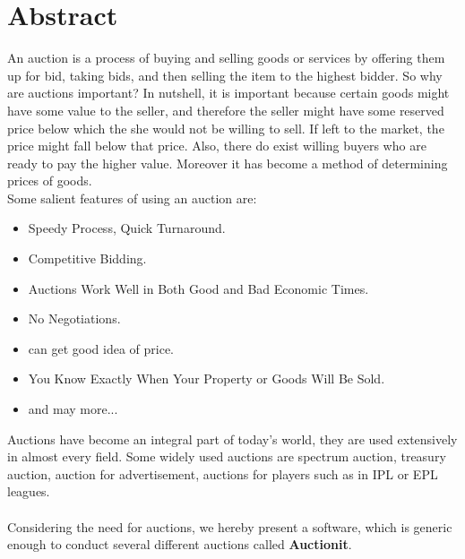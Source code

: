 \documentclass[a4paper]{article}
\begin{document}
% 
\section*{Abstract}




An auction is a process of buying and selling goods or services by offering them up for bid, 
taking bids, and then selling the item to the highest bidder. 
So why are auctions important? In nutshell, it is important because certain goods might have some value to the seller,
and therefore the seller might have some reserved price below which the she would not be willing to sell.
If left to the market, the price might fall below that price.
Also, there do exist willing buyers who are ready to pay the higher value.
Moreover it has become a method of determining prices of goods. \\
Some salient features of using an auction are:
\begin{itemize}
    \item Speedy Process, Quick Turnaround.
    \item Competitive Bidding.
    \item Auctions Work Well in Both Good and Bad Economic Times.
    \item No Negotiations.
    \item can get good idea of price.
    \item You Know Exactly When Your Property or Goods Will Be Sold.
    \item and may more...
\end{itemize}
Auctions have become an integral part of today's world, they are used extensively in almost every field. Some widely used auctions are spectrum auction, treasury auction, auction for advertisement, auctions for players such as in IPL or EPL leagues.\\ \\
Considering the need for auctions, we hereby present a software, which is generic enough to conduct several different auctions called \textbf{Auctionit}.
\\
\end{document}

